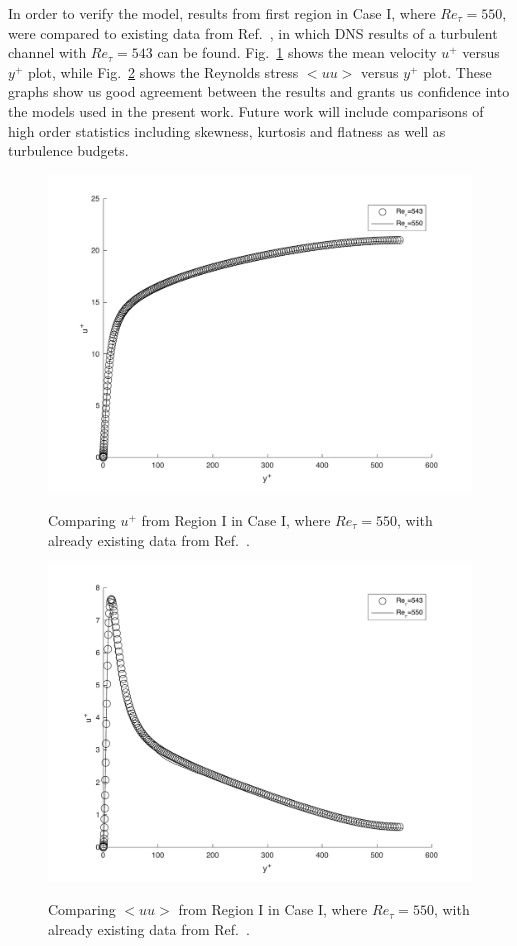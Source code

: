 \documentclass[twocolumn,10pt]{asme2e}
\begin{document}
In order to verify the model, results from first region in Case I, where \(Re_{\tau}=550\), were compared to existing data from Ref.~\cite{myoungkyu2015}, in which DNS results of a turbulent channel with \(Re_{\tau}=543\) can be found. Fig.~\ref{fig:comparing_u_543} shows the mean velocity \(u^+\) versus \(y^+\) plot, while Fig.~\ref{fig:comparing_uu_543} shows the Reynolds stress \(<uu>\) versus \(y^+\) plot. These graphs show us good agreement between the results and grants us confidence into the models used in the present work. Future work will include comparisons of high order statistics including skewness, kurtosis and flatness as well as turbulence budgets.

\begin{figure}[t]
\centering
\scalebox{0.5}
{\includegraphics{comparing_u_543.pdf}}
\caption{Comparing \(u^+\) from Region I in Case I, where \(Re_{\tau}=550\), with already existing data from Ref.~\cite{myoungkyu2015}.}
\label{fig:comparing_u_543}
\end{figure}

\begin{figure}[t]
\scalebox{0.5}
{\includegraphics{comparing_uu_543.pdf}}
\caption{Comparing \(<uu>\) from Region I in Case I, where \(Re_{\tau}=550\), with already existing data from Ref.~\cite{myoungkyu2015}.}
\label{fig:comparing_uu_543}
\end{figure}
\end{document}
